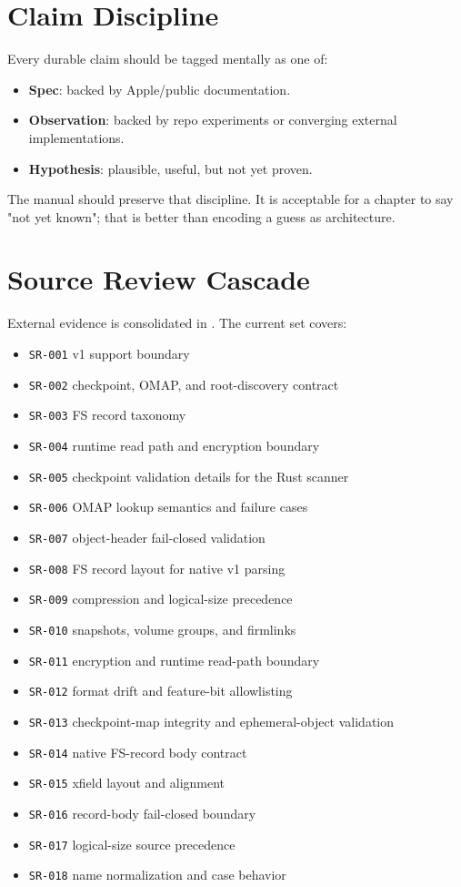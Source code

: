 \section{Claim Discipline}

Every durable claim should be tagged mentally as one of:

\begin{itemize}
  \item \textbf{Spec}: backed by Apple/public documentation.
  \item \textbf{Observation}: backed by repo experiments or converging external
  implementations.
  \item \textbf{Hypothesis}: plausible, useful, but not yet proven.
\end{itemize}

The manual should preserve that discipline. It is acceptable for a chapter to
say "not yet known"; that is better than encoding a guess as architecture.

\section{Source Review Cascade}

External evidence is consolidated in . The
current set covers:

\begin{itemize}
  \item \texttt{SR-001} v1 support boundary
  \item \texttt{SR-002} checkpoint, OMAP, and root-discovery contract
  \item \texttt{SR-003} FS record taxonomy
  \item \texttt{SR-004} runtime read path and encryption boundary
  \item \texttt{SR-005} checkpoint validation details for the Rust scanner
  \item \texttt{SR-006} OMAP lookup semantics and failure cases
  \item \texttt{SR-007} object-header fail-closed validation
  \item \texttt{SR-008} FS record layout for native v1 parsing
  \item \texttt{SR-009} compression and logical-size precedence
  \item \texttt{SR-010} snapshots, volume groups, and firmlinks
  \item \texttt{SR-011} encryption and runtime read-path boundary
  \item \texttt{SR-012} format drift and feature-bit allowlisting
  \item \texttt{SR-013} checkpoint-map integrity and ephemeral-object validation
  \item \texttt{SR-014} native FS-record body contract
  \item \texttt{SR-015} xfield layout and alignment
  \item \texttt{SR-016} record-body fail-closed boundary
  \item \texttt{SR-017} logical-size source precedence
  \item \texttt{SR-018} name normalization and case behavior
\end{itemize}

